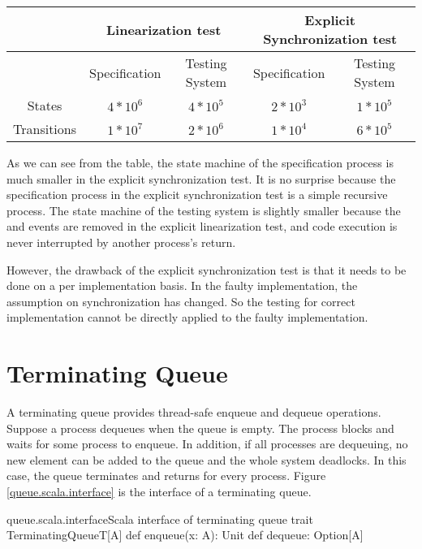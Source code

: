 \documentclass[a4paper, 12pt]{article}
\begin{document}
\begin{adjustbox}{width=\columnwidth,center}
\begin{tabular}{c c c c c}
  \hline
  & \multicolumn{2}{c}{Linearization test} & \multicolumn{2}{c}{Explicit Synchronization test} \\ \hline
  & Specification & Testing System & Specification & Testing System \\ \hline
  States      & $4*10^6$ & $4*10^5$ & $2*10^3$ & $1*10^5$\\ \hline
  Transitions & $1*10^7$ & $2*10^6$ & $1*10^4$ & $6*10^5$\\ \hline
\end{tabular}
\end{adjustbox}
\newline

As we can see from the table, the state machine of the specification process is much smaller in the explicit synchronization test. It is no surprise because the specification process in the explicit synchronization test is a simple recursive process. The state machine of the testing system is slightly smaller because the  and  events are removed in the explicit linearization test, and code execution is never interrupted by another process's return. 

However, the drawback of the explicit synchronization test is that it needs to be done on a per implementation basis. In the faulty implementation, the assumption on synchronization has changed. So the testing for correct implementation cannot be directly applied to the faulty implementation. 

\newpage
\section{Terminating Queue}
A terminating queue provides thread-safe enqueue and dequeue operations. Suppose a process dequeues when the queue is empty. The process blocks and waits for some process to enqueue. In addition, if all processes are dequeuing, no new element can be added to the queue and the whole system deadlocks. In this case, the queue terminates and returns  for every process. Figure \ref{queue.scala.interface} is the interface of a terminating queue.

\begin{scalafloat}{queue.scala.interface}{Scala interface of terminating queue}
trait TerminatingQueueT[A]{ 
  def enqueue(x: A): Unit
  def dequeue: Option[A] 
}
\end{scalafloat}
\end{document}
